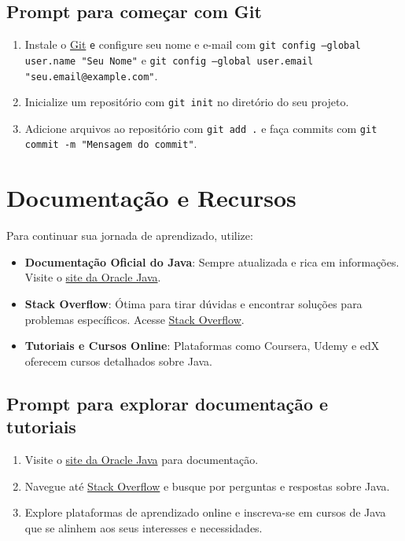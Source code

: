 \documentclass[a4paper,12pt]{book}
\begin{document}
\subsection{Prompt para começar com Git}
\begin{enumerate}
    \item Instale o \href{https://git-scm.com/downloads}{Git} \texttt e configure seu nome e e-mail com \texttt{git config --global user.name "Seu Nome"} e \texttt{git config --global user.email "seu.email@example.com"}.
    \item Inicialize um repositório com \texttt{git init} no diretório do seu projeto.
    \item Adicione arquivos ao repositório com \texttt{git add .} e faça commits com \texttt{git commit -m "Mensagem do commit"}.
\end{enumerate}

\section{Documentação e Recursos}

Para continuar sua jornada de aprendizado, utilize:

\begin{itemize}
    \item \textbf{Documentação Oficial do Java}: Sempre atualizada e rica em informações. Visite o \href{https://docs.oracle.com/en/java/}{site da Oracle Java}.
    \item \textbf{Stack Overflow}: Ótima para tirar dúvidas e encontrar soluções para problemas específicos. Acesse \href{https://stackoverflow.com/}{Stack Overflow}.
    \item \textbf{Tutoriais e Cursos Online}: Plataformas como Coursera, Udemy e edX oferecem cursos detalhados sobre Java.
\end{itemize}

\subsection{Prompt para explorar documentação e tutoriais}
\begin{enumerate}
    \item Visite o \href{https://docs.oracle.com/en/java/}{site da Oracle Java} para documentação.
    \item Navegue até \href{https://stackoverflow.com/}{Stack Overflow} e busque por perguntas e respostas sobre Java.
    \item Explore plataformas de aprendizado online e inscreva-se em cursos de Java que se alinhem aos seus interesses e necessidades.
\end{enumerate}
\end{document}
